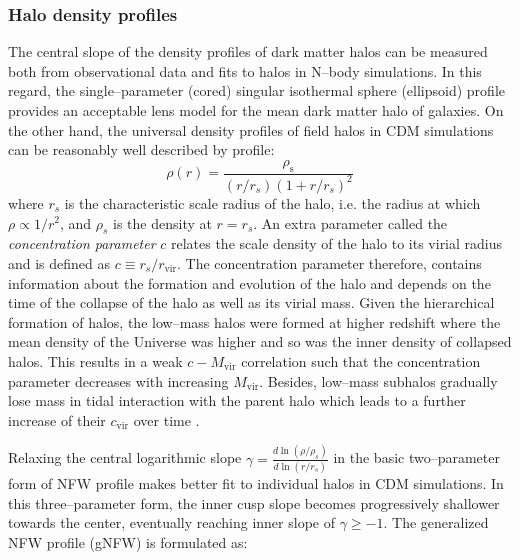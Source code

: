 \documentclass[paper=a4, fontsize=11pt]{scrartcl} %
\numberwithin{equation}{section} %
\numberwithin{figure}{section} %
\numberwithin{table}{section} %
\begin{document}
\subsubsection*{Halo density profiles}
The central slope of the density profiles of dark matter halos can be measured both from observational data and fits to halos in N--body simulations. In this regard, the single--parameter (cored) singular isothermal sphere (ellipsoid) profile provides an acceptable lens model for the mean dark matter halo of galaxies. On the other hand, the universal density profiles of field halos in CDM simulations can be reasonably well described by \citet[][ hereafter NFW]{NFW96} profile:
\begin{equation}
\label{eq:NFW}
\rho(r)=\frac{\rho_\mathrm{s}}{(r/r_s)(1+r/r_s)^{2}} \nonumber
\end{equation}
where $r_s$ is the characteristic scale radius of the halo, i.e. the radius at which $\rho \propto 1/r^2$, and $\rho_s$ is the density at $r=r_s$. An extra parameter called the \emph{concentration parameter} $c$ relates the scale density of the halo to its virial radius and is defined as $c\equiv r_s/r_\mathrm{vir}$. The concentration parameter therefore, contains information about the formation and evolution of the halo and depends on the time of the collapse of the halo as well as its virial mass. Given the hierarchical formation of halos, the low--mass halos were formed at higher redshift where the mean density of the Universe was higher and so was the inner density of collapsed halos. This results in a weak $c-M_\mathrm{vir}$ correlation such that the concentration parameter decreases with increasing $M_\mathrm{vir}$. {Besides, low--mass subhalos gradually lose mass in tidal interaction with the parent halo which leads to a further increase of their $c_\mathrm{vir}$ over time \citep{Bullock+2001, Maccio2008}.}

Relaxing the central logarithmic slope $\gamma = \frac{d\ln(\rho/\rho_s)}{d\ln(r/r_s)}$ in the basic two--parameter form of NFW profile makes better fit to individual halos in CDM simulations. In this three--parameter form, the inner cusp slope becomes progressively shallower towards the center, eventually reaching inner slope of $\gamma\geq-1$. The generalized NFW profile (gNFW) is formulated as:
\end{document}
